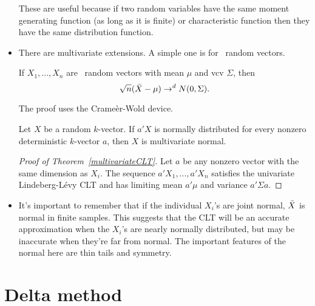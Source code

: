 \begin{itemize}
  These are useful because if two random variables have the same
  moment generating function (as long as it is finite) or
  characteristic function then they have the same distribution
  function.

\item There are multivariate extensions.  A simple one is for \iid\
  random vectors.
  \begin{thm}\label{multivariateCLT}
    If $X_1,...,X_n$ are \iid\ random vectors with mean $\mu$ and vcv $\Sigma$,
    then
    \begin{equation*}
      \sqrt{n}(\bar{X} - \mu) \to^d N(0,\Sigma).
    \end{equation*}
  \end{thm}

  The proof uses the Crame\`er-Wold device.
  \begin{thm}
    Let $X$ be a random $k$-vector.  If $a'X$ is normally distributed
    for every nonzero deterministic $k$-vector $a$, then $X$ is
    multivariate normal.
  \end{thm}

  \begin{proof}[Proof of Theorem~\ref{multivariateCLT}]
    Let $a$ be any nonzero vector with the same dimension as $X_i$.
    The sequence $a'X_1,...,a'X_n$ satisfies the univariate
    Lindeberg-L\'evy CLT and has limiting mean $a'\mu$ and variance
    $a'\Sigma a$.
\end{proof}

\item It's important to remember that if the individual $X_i$'s are
  joint normal, $\bar{X}$ is normal in finite samples.  This suggests that
  the CLT will be an accurate approximation when the $X_i$'s are
  nearly normally distributed, but may be inaccurate when they're far
  from normal.  The important features of the normal here are thin
  tails and symmetry.

\end{itemize}

\section{Delta method}

